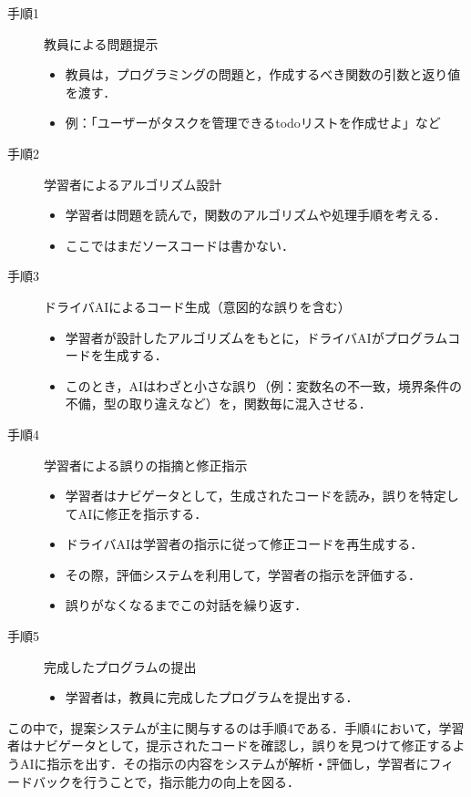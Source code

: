 \documentclass[twoside,twocolumn,10pt]{jsarticle}
\begin{document}
\begin{description}
    \item[手順1] 教員による問題提示
        \begin{itemize}
            \item 教員は，プログラミングの問題と，作成するべき関数の引数と返り値を渡す．
            \item 例：「ユーザーがタスクを管理できるtodoリストを作成せよ」など
        \end{itemize}
    \item[手順2] 学習者によるアルゴリズム設計
        \begin{itemize}
            \item 学習者は問題を読んで，関数のアルゴリズムや処理手順を考える．
            \item ここではまだソースコードは書かない．
        \end{itemize}
    \item[手順3] ドライバAIによるコード生成（意図的な誤りを含む）
        \begin{itemize}
            \item 学習者が設計したアルゴリズムをもとに，ドライバAIがプログラムコードを生成する．
            \item このとき，AIはわざと小さな誤り（例：変数名の不一致，境界条件の不備，型の取り違えなど）を，関数毎に混入させる．
        \end{itemize}
    \item[手順4] 学習者による誤りの指摘と修正指示
        \begin{itemize}
            \item 学習者はナビゲータとして，生成されたコードを読み，誤りを特定してAIに修正を指示する．
            \item ドライバAIは学習者の指示に従って修正コードを再生成する．
            \item その際，評価システムを利用して，学習者の指示を評価する．
            \item 誤りがなくなるまでこの対話を繰り返す．
        \end{itemize}
    \item[手順5] 完成したプログラムの提出
        \begin{itemize}
            \item 学習者は，教員に完成したプログラムを提出する．
        \end{itemize}
\end{description}

この中で，提案システムが主に関与するのは手順4である．手順4において，学習者はナビゲータとして，提示されたコードを確認し，誤りを見つけて修正するようAIに指示を出す．その指示の内容をシステムが解析・評価し，学習者にフィードバックを行うことで，指示能力の向上を図る．
\end{document}
